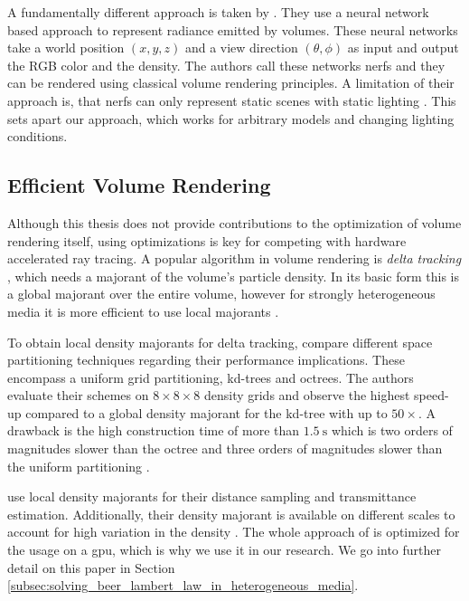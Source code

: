 A fundamentally different approach is taken by \citeauthor{mildenhall_nerf} \cite{mildenhall_nerf}.
They use a neural network based approach to represent radiance emitted by volumes.
These neural networks take a world position $(x, y, z)$ and a view direction $(\theta, \phi)$ as input and output the RGB color and the density.
The authors call these networks \acp{nerf} and they can be rendered using classical volume rendering principles.
A limitation of their approach is, that \acsp{nerf} can only represent static scenes with static lighting \cite{mildenhall_nerf}.
This sets apart our approach, which works for arbitrary models and changing lighting conditions.

\subsection{Efficient Volume Rendering}
Although this thesis does not provide contributions to the optimization of volume rendering itself, using optimizations is key for competing with hardware accelerated ray tracing.
A popular algorithm in volume rendering is \textit{delta tracking} \cite{woodcock}, which needs a majorant of the volume's particle density.
In its basic form this is a global majorant over the entire volume, however for strongly heterogeneous media it is more efficient to use local majorants \cite{novak_overview}.

To obtain local density majorants for delta tracking, \citeauthor{yue_space_partitioning} compare different space partitioning techniques regarding their performance implications.
These encompass a uniform grid partitioning, kd-trees and octrees.
The authors evaluate their schemes on $8 \times 8 \times 8$ density grids and observe the highest speed-up compared to a global density majorant for the kd-tree with up to ${50\times}$.
A drawback is the high construction time of more than $\SI{1.5}{\s}$ which is two orders of magnitudes slower than the octree and three orders of magnitudes slower than the uniform partitioning \cite{yue_space_partitioning}.

\citeauthor{brick_grid} use local density majorants for their distance sampling and transmittance estimation.
Additionally, their density majorant is available on different scales to account for high variation in the density \cite{brick_grid}.
The whole approach of \citeauthor{brick_grid} is optimized for the usage on a \ac{gpu}, which is why we use it in our research.
We go into further detail on this paper in Section \ref{subsec:solving_beer_lambert_law_in_heterogeneous_media}.

